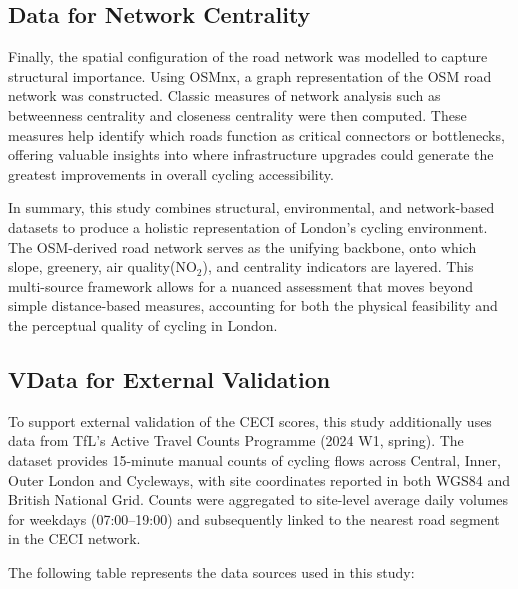 \documentclass[
  12pt,
  oneside]{book}
\begin{document}
\subsection{Data for Network Centrality}\label{data-for-network-centrality}

Finally, the spatial configuration of the road network was modelled to capture structural importance. Using OSMnx, a graph representation of the OSM road network was constructed. Classic measures of network analysis such as betweenness centrality and closeness centrality were then computed. These measures help identify which roads function as critical connectors or bottlenecks, offering valuable insights into where infrastructure upgrades could generate the greatest improvements in overall cycling accessibility.

In summary, this study combines structural, environmental, and network-based datasets to produce a holistic representation of London's cycling environment. The OSM-derived road network serves as the unifying backbone, onto which slope, greenery, air quality(NO\(_2\)), and centrality indicators are layered. This multi-source framework allows for a nuanced assessment that moves beyond simple distance-based measures, accounting for both the physical feasibility and the perceptual quality of cycling in London.

\subsection{VData for External Validation}\label{vdata-for-external-validation}

To support external validation of the CECI scores, this study additionally uses data from TfL's Active Travel Counts Programme (2024 W1, spring). The dataset provides 15-minute manual counts of cycling flows across Central, Inner, Outer London and Cycleways, with site coordinates reported in both WGS84 and British National Grid. Counts were aggregated to site-level average daily volumes for weekdays (07:00--19:00) and subsequently linked to the nearest road segment in the CECI network.

The following table represents the data sources used in this study:

\begingroup\fontsize{9}{11}\selectfont
\end{document}
